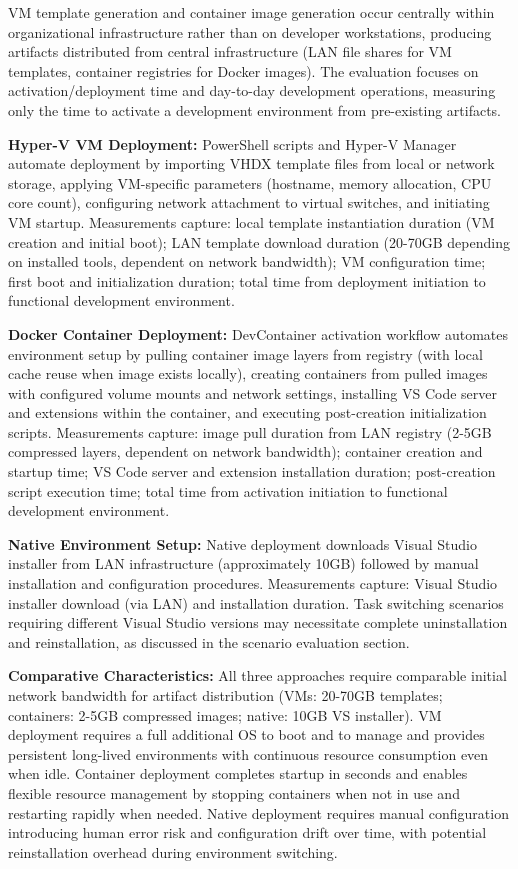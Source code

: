 VM template generation and container image generation occur centrally within organizational infrastructure rather than on developer workstations, producing artifacts distributed from central infrastructure (LAN file shares for VM templates, container registries for Docker images).
The evaluation focuses on activation/deployment time and day-to-day development operations, measuring only the time to activate a development environment from pre-existing artifacts.

\textbf{Hyper-V VM Deployment:} PowerShell scripts and Hyper-V Manager automate deployment by importing VHDX template files from local or network storage, applying VM-specific parameters (hostname, memory allocation, CPU core count), configuring network attachment to virtual switches, and initiating VM startup.
Measurements capture: local template instantiation duration (VM creation and initial boot); LAN template download duration (20-70GB depending on installed tools, dependent on network bandwidth); VM configuration time; first boot and initialization duration; total time from deployment initiation to functional development environment.

\textbf{Docker Container Deployment:} DevContainer activation workflow automates environment setup by pulling container image layers from registry (with local cache reuse when image exists locally), creating containers from pulled images with configured volume mounts and network settings, installing VS Code server and extensions within the container, and executing post-creation initialization scripts.
Measurements capture: image pull duration from LAN registry (2-5GB compressed layers, dependent on network bandwidth); container creation and startup time; VS Code server and extension installation duration; post-creation script execution time; total time from activation initiation to functional development environment.

\textbf{Native Environment Setup:} Native deployment downloads Visual Studio installer from LAN infrastructure (approximately 10GB) followed by manual installation and configuration procedures.
Measurements capture: Visual Studio installer download (via LAN) and installation duration.
Task switching scenarios requiring different Visual Studio versions may necessitate complete uninstallation and reinstallation, as discussed in the scenario evaluation section.

\textbf{Comparative Characteristics:} All three approaches require comparable initial network bandwidth for artifact distribution (VMs: 20-70GB templates; containers: 2-5GB compressed images; native: 10GB VS installer).
VM deployment requires a full additional OS to boot and to manage and provides persistent long-lived environments with continuous resource consumption even when idle.
Container deployment completes startup in seconds and enables flexible resource management by stopping containers when not in use and restarting rapidly when needed.
Native deployment requires manual configuration introducing human error risk and configuration drift over time, with potential reinstallation overhead during environment switching.

